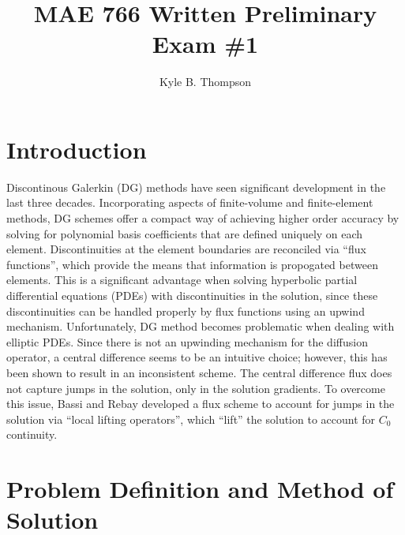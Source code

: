 \documentclass[a4paper]{article}
\title{MAE 766 Written Preliminary Exam \#1}
\author{ Kyle B. Thompson }
\begin{document}
\maketitle

\section{Introduction}
Discontinous Galerkin (DG) methods have seen significant development in the last
three decades.  Incorporating aspects of finite-volume and finite-element
methods, DG schemes offer a compact way of achieving higher order accuracy by
solving for polynomial basis coefficients that are defined uniquely on each
element.  Discontinuities at the element boundaries are reconciled via ``flux
functions'', which provide the means that information is propogated between
elements.  This is a significant advantage when solving hyperbolic partial
differential equations (PDEs) with discontinuities in the solution, since these
discontinuities can be handled properly by flux functions using an upwind
mechanism.  Unfortunately, DG method becomes problematic when dealing with
elliptic PDEs.  Since there is not an upwinding mechanism for the diffusion
operator, a central difference seems to be an intuitive choice; however, this
has been shown to result in an inconsistent scheme. The central difference flux
does not capture jumps in the solution, only in the solution gradients.  To
overcome this issue, Bassi and Rebay developed a flux scheme to account for
jumps in the solution via ``local lifting operators'', which ``lift'' the
solution to account for $C_0$ continuity.

\section{Problem Definition and Method of Solution}
\end{document}

